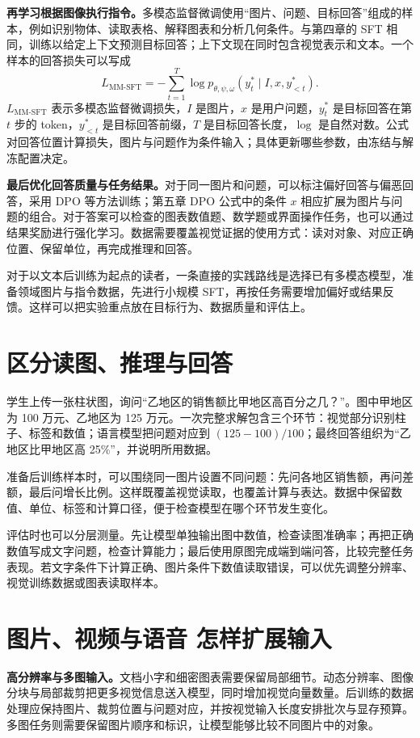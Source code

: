 \textbf{再学习根据图像执行指令。}多模态监督微调使用``图片、问题、目标回答''组成的样本，例如识别物体、读取表格、解释图表和分析几何条件。与第四章的 SFT 相同，训练以给定上下文预测目标回答；上下文现在同时包含视觉表示和文本。一个样本的回答损失可以写成
\[
L_{\mathrm{MM\text{-}SFT}}
=-\sum_{t=1}^{T}\log p_{\theta,\psi,\omega}
(y_t^*\mid I,x,y_{<t}^*).
\]
$L_{\mathrm{MM\text{-}SFT}}$ 表示多模态监督微调损失，$I$ 是图片，$x$ 是用户问题，$y_t^*$ 是目标回答在第 $t$ 步的 token，$y_{<t}^*$ 是目标回答前缀，$T$ 是目标回答长度，$\log$ 是自然对数。公式对回答位置计算损失，图片与问题作为条件输入；具体更新哪些参数，由冻结与解冻配置决定。

\textbf{最后优化回答质量与任务结果。}对于同一图片和问题，可以标注偏好回答与偏恶回答，采用 DPO 等方法训练；第五章 DPO 公式中的条件 $x$ 相应扩展为图片与问题的组合。对于答案可以检查的图表数值题、数学题或界面操作任务，也可以通过结果奖励进行强化学习。数据需要覆盖视觉证据的使用方式：读对对象、对应正确位置、保留单位，再完成推理和回答。

对于以文本后训练为起点的读者，一条直接的实践路线是选择已有多模态模型，准备领域图片与指令数据，先进行小规模 SFT，再按任务需要增加偏好或结果反馈。这样可以把实验重点放在目标行为、数据质量和评估上。

\section{区分读图、推理与回答}

学生上传一张柱状图，询问``乙地区的销售额比甲地区高百分之几？''。图中甲地区为 100 万元、乙地区为 125 万元。一次完整求解包含三个环节：视觉部分识别柱子、标签和数值；语言模型把问题对应到 $(125-100)/100$；最终回答组织为``乙地区比甲地区高 25\%''，并说明所用数据。

准备后训练样本时，可以围绕同一图片设置不同问题：先问各地区销售额，再问差额，最后问增长比例。这样既覆盖视觉读取，也覆盖计算与表达。数据中保留数值、单位、标签和计算口径，便于检查模型在哪个环节发生变化。

评估时也可以分层测量。先让模型单独输出图中数值，检查读图准确率；再把正确数值写成文字问题，检查计算能力；最后使用原图完成端到端问答，比较完整任务表现。若文字条件下计算正确、图片条件下数值读取错误，可以优先调整分辨率、视觉训练数据或图表读取样本。

\section{图片、视频与语音 怎样扩展输入}

\textbf{高分辨率与多图输入。}文档小字和细密图表需要保留局部细节。动态分辨率、图像分块与局部裁剪把更多视觉信息送入模型，同时增加视觉向量数量。后训练的数据处理应保持图片、裁剪位置与问题对应，并按视觉输入长度安排批次与显存预算。多图任务则需要保留图片顺序和标识，让模型能够比较不同图片中的对象。

